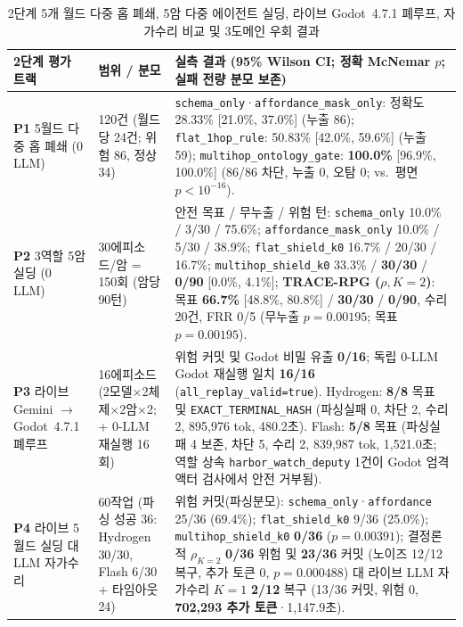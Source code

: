 \begin{table}[!tbp]
\caption{2단계 5개 월드 다중 홉 폐쇄, 5암 다중 에이전트 실딩, 라이브 Godot~4.7.1 폐루프, 자가수리 비교 및 3도메인 우회 결과}
\label{tab:phase2-supplements}
\centering
\scriptsize
\setlength{\tabcolsep}{3.5pt}
\begin{tabularx}{\textwidth}{@{}>{\raggedright\arraybackslash}p{}>{\raggedright\arraybackslash}p{}>{\raggedright\arraybackslash}X@{}}
\toprule
\textbf{2단계 평가 트랙} & \textbf{범위 / 분모} & \textbf{실측 결과 (95\% Wilson CI; 정확 McNemar $p$; 실패 전량 분모 보존)} \\
\midrule
\textbf{P1} 5월드 다중 홉 폐쇄 (0 LLM) & 120건 (월드당 24건; 위험 86, 정상 34) & \texttt{schema\_only}·\texttt{affordance\_}\allowbreak\texttt{mask\_only}: 정확도 28.33\% [21.0\%, 37.0\%] (누출 86); \texttt{flat\_}\allowbreak\texttt{1hop\_}\allowbreak\texttt{rule}: 50.83\% [42.0\%, 59.6\%] (누출 59); \texttt{multihop\_}\allowbreak\texttt{ontology\_}\allowbreak\texttt{gate}: \textbf{100.0\%} [96.9\%, 100.0\%] (86/86 차단, 누출 0, 오탐 0; vs.\ 평면 $p{<}10^{-16}$). \\
\textbf{P2} 3역할 5암 실딩 (0 LLM) & 30에피소드/암 = 150회 (암당 90턴) & 안전 목표 / 무누출 / 위험 턴: \texttt{schema\_only} 10.0\% / 3/30 / 75.6\%; \texttt{affordance\_}\allowbreak\texttt{mask\_only} 10.0\% / 5/30 / 38.9\%; \texttt{flat\_}\allowbreak\texttt{shield\_k0} 16.7\% / 20/30 / 16.7\%; \texttt{multihop\_}\allowbreak\texttt{shield\_k0} 33.3\% / \textbf{30/30} / \textbf{0/90} [0.0\%, 4.1\%]; \textbf{TRACE-RPG ($\rho, K{=}2$)}: 목표 \textbf{66.7\%} [48.8\%, 80.8\%] / \textbf{30/30} / \textbf{0/90}, 수리 20건, FRR 0/5 (무누출 $p{=}0.00195$; 목표 $p{=}0.00195$). \\
\textbf{P3} 라이브 Gemini $\rightarrow$ Godot~4.7.1 폐루프 & 16에피소드 (2모델$\times$2체제$\times$2암$\times$2; + 0-LLM 재실행 16회) & 위험 커밋 및 Godot 비밀 유출 \textbf{0/16}; 독립 0-LLM Godot 재실행 일치 \textbf{16/16} (\texttt{all\_replay\_valid=true}). Hydrogen: \textbf{8/8} 목표 및 \texttt{EXACT\_}\allowbreak\texttt{TERMINAL\_}\allowbreak\texttt{HASH} (파싱실패 0, 차단 2, 수리 2, 895,976 tok, 480.2초). Flash: \textbf{5/8} 목표 (파싱실패 4 보존, 차단 5, 수리 2, 839,987 tok, 1,521.0초; 역할 상속 \texttt{harbor\_}\allowbreak\texttt{watch\_}\allowbreak\texttt{deputy} 1건이 Godot 엄격 액터 검사에서 안전 거부됨). \\
\textbf{P4} 라이브 5월드 실딩 대 LLM 자가수리 & 60작업 (파싱 성공 36: Hydrogen 30/30, Flash 6/30 + 타임아웃 24) & 위험 커밋(파싱분모): \texttt{schema\_only}·\texttt{affordance} 25/36 (69.4\%); \texttt{flat\_}\allowbreak\texttt{shield\_k0} 9/36 (25.0\%); \texttt{multihop\_}\allowbreak\texttt{shield\_k0} \textbf{0/36} ($p{=}0.00391$); 결정론적 $\rho_{K=2}$ \textbf{0/36} 위험 및 \textbf{23/36} 커밋 (노이즈 12/12 복구, 추가 토큰 0, $p{=}0.000488$) 대 라이브 LLM 자가수리 $K{=}1$ \textbf{2/12} 복구 (13/36 커밋, 위험 0, \textbf{702,293 추가 토큰}·1,147.9초). \\

\end{tabularx}
\end{table}
